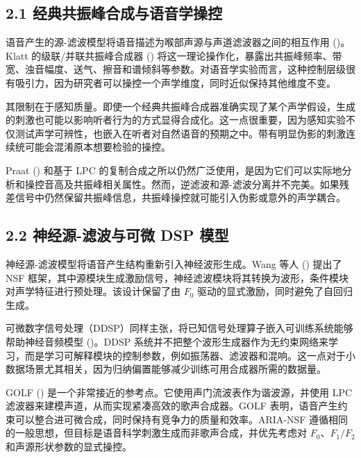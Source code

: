 \subsection{2.1
经典共振峰合成与语音学操控}\label{ux7ecfux5178ux5171ux632fux5cf0ux5408ux6210ux4e0eux8bedux97f3ux5b66ux64cdux63a7}

语音产生的源-滤波模型将语音描述为喉部声源与声道滤波器之间的相互作用
()。Klatt
的级联/并联共振峰合成器 ()
将这一理论操作化，暴露出共振峰频率、带宽、浊音幅度、送气、擦音和谱倾斜等参数。对语音学实验而言，这种控制层级很有吸引力，因为研究者可以操控一个声学维度，同时近似保持其他维度不变。

其限制在于感知质量。即使一个经典共振峰合成器准确实现了某个声学假设，生成的刺激也可能以影响听者行为的方式显得合成化。这一点很重要，因为感知实验不仅测试声学可辨性，也嵌入在听者对自然语音的预期之中。带有明显伪影的刺激连续统可能会混淆原本想要检验的操控。

Praat () 和基于 LPC
的复制合成之所以仍然广泛使用，是因为它们可以实际地分析和操控音高及共振峰相关属性。然而，逆滤波和源-滤波分离并不完美。如果残差信号中仍然保留共振峰信息，共振峰操控就可能引入伪影或意外的声学耦合。

\subsection{2.2 神经源-滤波与可微 DSP
模型}\label{ux795eux7ecfux6e90-ux6ee4ux6ce2ux4e0eux53efux5fae-dsp-ux6a21ux578b}

神经源-滤波模型将语音产生结构重新引入神经波形生成。Wang 等人
() 提出了 NSF
框架，其中源模块生成激励信号，神经滤波模块将其转换为波形，条件模块对声学特征进行预处理。该设计保留了由
\(F_0\) 驱动的显式激励，同时避免了自回归生成。

可微数字信号处理（DDSP）同样主张，将已知信号处理算子嵌入可训练系统能够帮助神经音频模型
()。DDSP
系统并不把整个波形生成器作为无约束网络来学习，而是学习可解释模块的控制参数，例如振荡器、滤波器和混响。这一点对于小数据场景尤其相关，因为归纳偏置能够减少训练可用合成器所需的数据量。

GOLF ()
是一个非常接近的参考点。它使用声门流波表作为谐波源，并使用 LPC
滤波器来建模声道，从而实现紧凑高效的歌声合成器。GOLF
表明，语音产生约束可以整合进可微合成，同时保持有竞争力的质量和效率。ARIA-NSF
遵循相同的一般思想，但目标是语音科学刺激生成而非歌声合成，并优先考虑对
\(F_0\)、\(F_1/F_2\) 和声源形状参数的显式操控。

